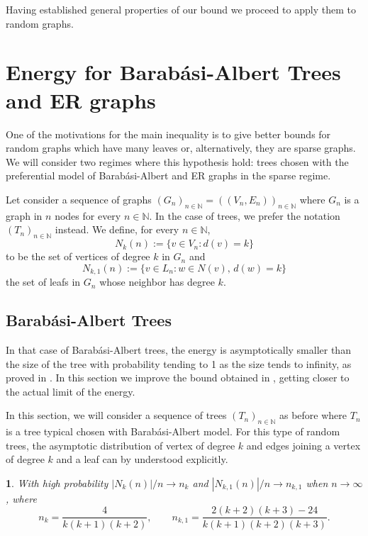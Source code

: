 \documentclass[a4paper]{article}
\newcommand{\N}{\mathbb{N}}
\newcommand{\abs}[1]{\left\lvert#1\right\rvert}
\theoremstyle{plain}
\newtheorem{proposition}{\protect\propname}
\renewcommand{\propname}{Proposition}
\renewcommand{\propname}{Proposici\'on}
\begin{document}
Having established general properties of our bound we proceed to apply them to random graphs.

\section{Energy for Barab\'asi-Albert Trees and ER graphs} \label{BA_section}

One of the motivations for the main inequality is to give better bounds for random graphs which have many leaves or, alternatively, they are sparse graphs. We will consider two regimes where this hypothesis hold: trees chosen with the preferential model of Barab\'asi-Albert \cite{Barabasi99} and ER graphs \cite{Erdos59} in the sparse regime. %

Let consider a sequence of graphs \((G_n)_{n \in \N} = ((V_n,E_n))_{n \in \N}\) where $G_n$ is a graph in $n$ nodes for every $n \in \N$. In the case of trees, we prefer the notation $(T_n)_{n \in \N}$ instead. We define, for every $n \in \N$,
\[
    N_k(n) := \{v \in V_n : d(v) = k\}
\]
to be the set of vertices of degree \(k\) in \(G_n\) and
\[
    N_{k,1}(n) := \{v \in L_n : w \in N(v),\, d(w) = k\}
\]
the set of leafs in \(G_n\) whose neighbor has degree \(k\).

\subsection{Barab\'asi-Albert Trees}

In that case of Barab\'asi-Albert trees, the energy is asymptotically smaller than the size of the tree with probability tending to 1 as the size tends to infinity, as proved in \cite{Arizmendi22}. In this section  we improve the bound obtained in \cite{Arizmendi22}, getting closer to the actual limit of the energy. 

In this section, we will consider a sequence of trees $(T_n)_{n \in \N}$ as before where $T_n$ is a tree typical chosen with Barab\'asi-Albert model. For this type of random trees, the asymptotic distribution of vertex of degree $k$ and edges joining a vertex of degree $k$ and a leaf can by understood explicitly. 

\begin{proposition}\label{BA-coefficients} 
\cite{Bollobas01, McDonald}
With high probability \(\abs{N_k(n)}/n \to n_k\) and \(\abs{N_{k,1}(n)}/n \to n_{k,1}\) when \(n \to \infty\), where
\[
    n_k = \frac{4}{k(k+1)(k+2)}, \qquad n_{k,1} = \frac{2(k+2)(k+3)-24}{k(k+1)(k+2)(k+3)}.
\]
\end{proposition}
\end{document}

